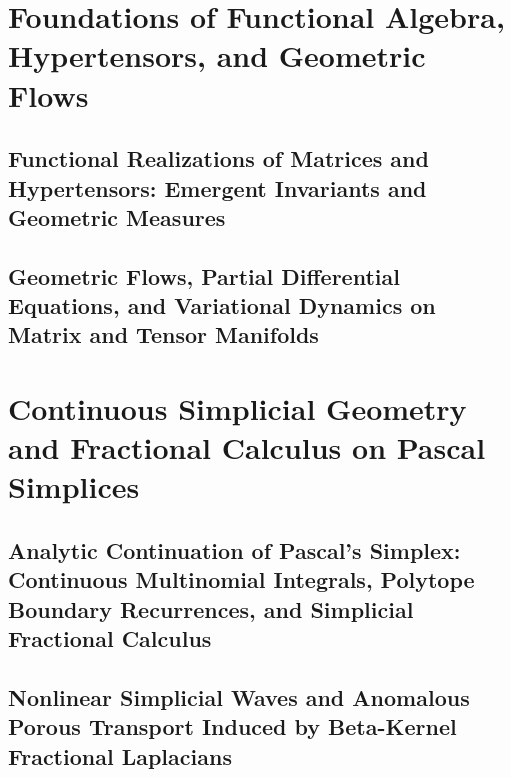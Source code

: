 \documentclass[11pt,a4paper,openright,twoside]{book}
\begin{document}
\tableofcontents

\mainmatter

\part{Foundations of Functional Algebra, Hypertensors, and Geometric Flows}

\chapter{Functional Realizations of Matrices and Hypertensors: Emergent Invariants and Geometric Measures}


\chapter{Geometric Flows, Partial Differential Equations, and Variational Dynamics on Matrix and Tensor Manifolds}


\part{Continuous Simplicial Geometry and Fractional Calculus on Pascal Simplices}

\chapter{Analytic Continuation of Pascal's Simplex: Continuous Multinomial Integrals, Polytope Boundary Recurrences, and Simplicial Fractional Calculus}


\chapter{Nonlinear Simplicial Waves and Anomalous Porous Transport Induced by Beta-Kernel Fractional Laplacians}

\end{document}
